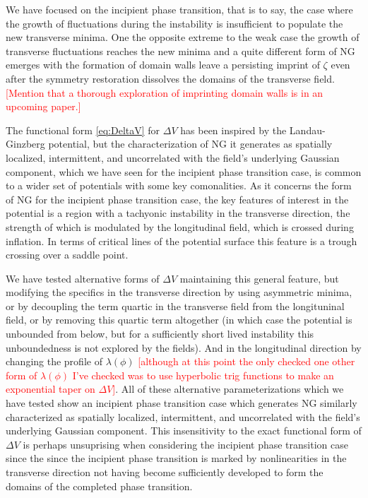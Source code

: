 We have focused on the incipient phase transition, that is to say, the case where the growth of fluctuations during the instability is insufficient to populate the new transverse minima. One the opposite extreme to the weak case the growth of transverse fluctuations reaches the new minima and a quite different form of NG emerges with the formation of domain walls leave a persisting imprint of $\zeta$ even after the symmetry restoration dissolves the domains of the transverse field.
\textcolor{red}{[Mention that a thorough exploration of imprinting domain walls is in an upcoming paper.]}

The functional form \eqref{eq:DeltaV} for $\Delta V$ has been inspired by the Landau-Ginzberg potential, but the characterization of NG it generates as spatially localized, intermittent, and uncorrelated with the field's underlying Gaussian component, which we have seen for the incipient phase transition case, is common to a wider set of potentials with some key comonalities. As it concerns the form of NG for the incipient phase transition case, the key features of interest in the potential is a region with a tachyonic instability in the transverse direction, the strength of which is modulated by the longitudinal field, which is crossed during inflation. In terms of critical lines of the potential surface this feature is a trough crossing over a saddle point.

We have tested alternative forms of $\Delta V$ maintaining this general feature, but modifying the specifics in the transverse direction by using asymmetric minima, or by decoupling the term quartic in the transverse field from the longituninal field, or by removing this quartic term altogether (in which case the potential is unbounded from below, but for a sufficiently short lived instability this unboundedness is not explored by the fields). And in the longitudinal direction by changing the profile of $\lambda(\phi)$ \textcolor{red}{[although at this point the only checked one other form of $\lambda(\phi)$ I've checked was to use hyperbolic trig functions to make an exponential taper on $\Delta V$]}. All of these alternative parameterizations which we have tested show an incipient phase transition case which generates NG similarly characterized as spatially localized, intermittent, and uncorrelated with the field's underlying Gaussian component. This insensitivity to the exact functional form of $\Delta V$ is perhaps unsuprising when considering the incipient phase transition case since the since the incipient phase transition is marked by nonlinearities in the transverse direction not having become sufficiently developed to form the domains of the completed phase transition.

